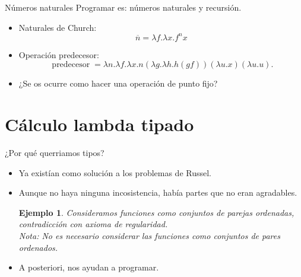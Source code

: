 \documentclass[usenames,dvipsnames]{beamer}
\newtheorem{ejemplo}{Ejemplo}
\begin{document}
\begin{frame}{Números naturales}
  Programar es: números naturales y recursión.
  \begin{itemize}
  \item Naturales de Church:
    $$\overline n = \lambda f.\lambda x. f^n x$$
  \item Operación predecesor:
    $$\operatorname{predecesor} =\lambda n.\lambda f.\lambda x. n (\lambda g.\lambda h. h (g f)) (\lambda u.x) (\lambda u.u). $$
  \item ¿Se os ocurre como hacer una operación de punto fijo?
  \end{itemize}
\end{frame}



\section{Cálculo lambda tipado}
\begin{frame}{¿Por qué querriamos tipos?}
  \begin{itemize}
  \item Ya existían como solución a los problemas de Russel.
  \item Aunque no haya ninguna incosistencia, había partes que no eran agradables.
    \begin{ejemplo}
      Consideramos funciones como conjuntos de parejas ordenadas, contradicción con \emph{axioma de regularidad}. \\
       Nota: No es necesario considerar las funciones como conjuntos de pares ordenados.
    \end{ejemplo}

  \item A posteriori, nos ayudan a programar. 
  \end{itemize}
\end{frame}
\end{document}
